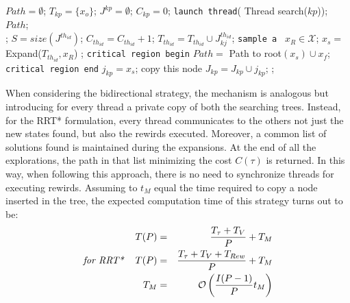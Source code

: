 \begin{algorithm}
\caption{}\label{alg:RRT_single_MT_02}
\begin{algorithmic}[1]
\State $Path = \emptyset$;
\State $T_{kp}=\lbrace x_o \rbrace$;
\State $J^{kp}=\emptyset$;
\State $C_{kp}=0$;
\State \texttt{launch thread}( Thread search($kp$));
\EndFor
\State \Return $Path$;
\EndProcedure
\\
	\Return;
	\EndIf
	\State $S=size(J^{th_{id}})$;
		\State $C_{th_{id}}=C_{th_{id}}+1$;
		\State $T_{th_{id}} = T_{th_{id}} \cup J^{th_{id}}_{kj}$;
	\EndFor
	\State \texttt{sample a}\,\,\, $x_R \in  \mathcal{X}$;
	\State $x_s =$ Expand($T_{th_{id}} , x_R$) ;
		\State \texttt{critical region begin}
		\State $Path=$ Path to root$(x_s) \cup x_f$;	
		\State \texttt{critical region end}
			\State $j_{kp}=x_s$; \Comment copy this node
			\State $J_{kp}= J_{kp} \cup j_{kp}$;
			\EndIf
			\EndFor
		\State \Return;
	\EndIf
\EndFor
\EndProcedure
\end{algorithmic}
\end{algorithm}

When considering the bidirectional strategy, the mechanism is analogous but introducing for every thread  a private copy of both the searching trees. Instead, for the RRT* formulation, every thread communicates to the others not just the new states found, but also the rewirds executed.
Moreover, a common list of solutions found is maintained during the expansions. At the end of all the explorations, the path in that list minimizing the cost $C(\tau)$ is returned.
In this way, when following this approach, there is no need to synchronize threads for executing rewirds.
Assuming to $t_M$ equal the time required to copy a node inserted in the tree, the expected computation time of this strategy turns out to be:
\begin{eqnarray}
T(P) &=& \frac{T_{\tau} + T_V }{P} + T_M  \nonumber\\
\textit{for RRT*  \,\,\,\,\,}  T(P) &=& \frac{T_{\tau} + T_V + T_{Rew} }{P} + T_M \nonumber\\
T_M  & = & \mathcal{O} \left(  \frac{I(P-1)}{P} t_M \right)
\end{eqnarray}  

